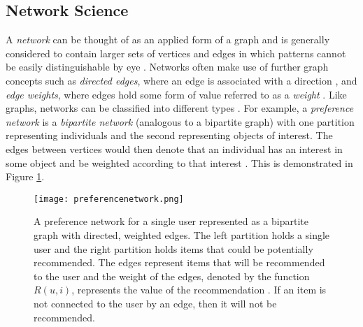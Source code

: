 \subsection{Network Science}

A \textit{network} can be thought of as an applied form of a graph \citep{Newman2003} and is generally considered to contain larger sets of vertices and edges in which patterns cannot be easily distinguishable by eye \citep{Newman2003}. Networks often make use of further graph concepts such as \textit{directed edges}, where an edge is associated with a direction \citep{Newman2003}, and \textit{edge weights}, where edges hold some form of value referred to as a \textit{weight} \citep{Bondy1976}. Like graphs, networks can be classified into different types \citep{Newman2003}. For example, a \textit{preference network} is a \textit{bipartite network} (analogous to a bipartite graph) with one partition representing individuals and the second representing objects of interest. The edges between vertices would then denote that an individual has an interest in some object and be weighted according to that interest \citep{Newman2003}. This is demonstrated in Figure \ref{fig:prefnetwork}.

    \begin{figure}[t]
        \centering
        \texttt{[image: preferencenetwork.png]}
        \caption{A preference network for a single user represented as a bipartite graph with directed, weighted edges. The left partition holds a single user and the right partition holds items that could be potentially recommended. The edges represent items that will be recommended to the user and the weight of the edges, denoted by the function $R(u, i)$, represents the value of the recommendation \citep{Newman2003}. If an item is not connected to the user by an edge, then it will not be recommended.}
        \label{fig:prefnetwork}
    \end{figure}

